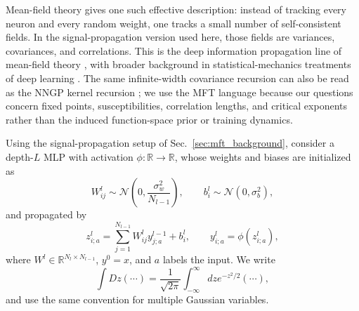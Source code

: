 Mean-field theory gives one such effective description: instead of tracking every neuron and every random weight, one tracks a small number of self-consistent fields. In the signal-propagation version used here, those fields are variances, covariances, and correlations. This is the deep information propagation line of mean-field theory \cite{poole2016exponentialexpressivitydeepneural,schoenholz2017deepinformationpropagation}, with broader background in statistical-mechanics treatments of deep learning \cite{Bahri2020StatMechDeepLearning,bahri2024leshoucheslecturesdeep}. The same infinite-width covariance recursion can also be read as the NNGP kernel recursion \cite{Lee2018DNNasGP}; we use the MFT language because our questions concern fixed points, susceptibilities, correlation lengths, and critical exponents rather than the induced function-space prior or training dynamics.

Using the signal-propagation setup of Sec.~\ref{sec:mft_background}, consider a depth-$L$ MLP with activation $\phi:\mathbb R\to\mathbb R$, whose weights and biases are initialized as
\begin{equation}
W^{l}_{ij}\sim \mathcal{N}\left(0,\frac{\sigma_{w}^{2}}{N_{l-1}}\right), \qquad b^{l}_{i}\sim \mathcal{N}\left(0,\sigma_{b}^{2}\right),
\end{equation}
and propagated by
\begin{equation}
z^{l}_{i;a}= \sum_{j=1}^{N_{l-1}} W^{l}_{ij} y^{l-1}_{j;a}+b^{l}_{i}, \qquad y^{l}_{i;a}=\phi\left(z^{l}_{i;a}\right),
\end{equation}
where $W^l\in\mathbb R^{N_l\times N_{l-1}}$, $y^0=x$, and $a$ labels the input. We write
\begin{equation}
\int Dz (\cdots)=\frac{1}{\sqrt{2\pi}}\int_{-\infty}^{\infty}dz e^{-z^{2}/2}(\cdots),
\end{equation}
and use the same convention for multiple Gaussian variables.

